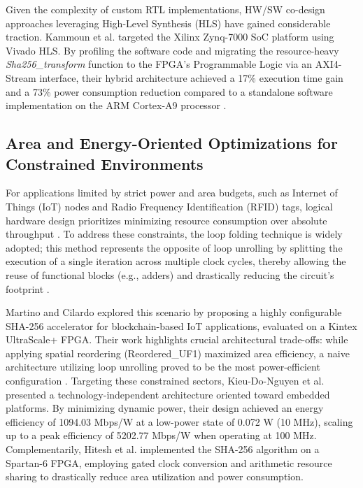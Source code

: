 \documentclass[conference]{IEEEtran}
\begin{document}
Given the complexity of custom RTL implementations, HW/SW co-design approaches leveraging High-Level Synthesis (HLS) have gained considerable traction. Kammoun et al. \cite{kammoun2020} targeted the Xilinx Zynq-7000 SoC platform using Vivado HLS. By profiling the software code and migrating the resource-heavy \textit{Sha256\_transform} function to the FPGA's Programmable Logic via an AXI4-Stream interface, their hybrid architecture achieved a 17\% execution time gain and a 73\% power consumption reduction compared to a standalone software implementation on the ARM Cortex-A9 processor \cite{kammoun2020}. 

\subsection{Area and Energy-Oriented Optimizations for Constrained Environments}
For applications limited by strict power and area budgets, such as Internet of Things (IoT) nodes and Radio Frequency Identification (RFID) tags, logical hardware design prioritizes minimizing resource consumption over absolute throughput \cite{martino2020}. To address these constraints, the loop folding technique \cite{feldhofer2006, kim2008} is widely adopted; this method represents the opposite of loop unrolling by splitting the execution of a single iteration across multiple clock cycles, thereby allowing the reuse of functional blocks (e.g., adders) and drastically reducing the circuit's footprint \cite{martino2020}. 

Martino and Cilardo \cite{martino_iot2020} explored this scenario by proposing a highly configurable SHA-256 accelerator for blockchain-based IoT applications, evaluated on a Kintex UltraScale+ FPGA. Their work highlights crucial architectural trade-offs: while applying spatial reordering (Reordered\_UF1) maximized area efficiency, a naive architecture utilizing loop unrolling proved to be the most power-efficient configuration \cite{martino_iot2020}. Targeting these constrained sectors, Kieu-Do-Nguyen et al. \cite{r4} presented a technology-independent architecture oriented toward embedded platforms. By minimizing dynamic power, their design achieved an energy efficiency of 1094.03 Mbps/W at a low-power state of 0.072 W (10 MHz), scaling up to a peak efficiency of 5202.77 Mbps/W when operating at 100 MHz. Complementarily, Hitesh et al. \cite{hitesh2023} implemented the SHA-256 algorithm on a Spartan-6 FPGA, employing gated clock conversion and arithmetic resource sharing to drastically reduce area utilization and power consumption.
\end{document}
